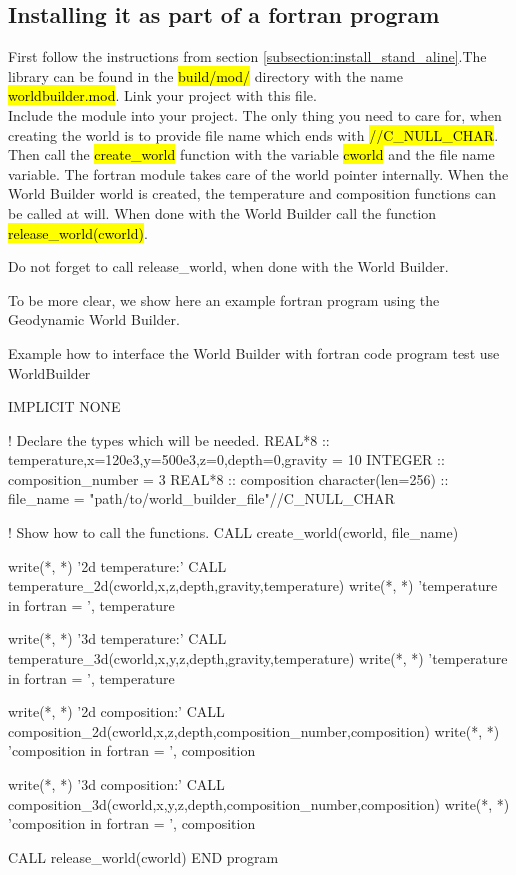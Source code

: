 \documentclass{book}
\newcommand{\GWB}{{Geodynamic World Builder}}
\newcommand{\WB}{{World Builder}}
\begin{document}
\subsection{Installing it as part of a fortran program}
First follow the instructions from section \ref{subsection:install_stand_aline}.The library can be found in the \hl{build/mod/} directory with the name \hl{worldbuilder.mod}. Link your project with this file. 
\\
Include the module into your project. The only thing you need to care for, when creating the world is to provide file name which ends with \hl{//C\_NULL\_CHAR}. Then call the \hl{create\_world} function with the variable \hl{cworld} and the file name variable. The fortran module takes care of the world pointer internally. When the \WB{} world is created, the temperature and composition functions can be called at will. When done with the \WB{} call the function \hl{release\_world(cworld)}. 
\begin{remark}
Do not forget to call release\_world, when done with the \WB{}.
\end{remark}
To be more clear, we show here an example fortran program using the \GWB{}. 

\begin{fortrancode}{Example how to interface the \WB{} with fortran code}
program test
use WorldBuilder

IMPLICIT NONE

  ! Declare the types which will be needed.
  REAL*8 :: temperature,x=120e3,y=500e3,z=0,depth=0,gravity = 10
  INTEGER :: composition_number = 3
  REAL*8 :: composition
  character(len=256) :: file_name = "path/to/world_builder_file"//C_NULL_CHAR

  ! Show how to call the functions.
  CALL create_world(cworld, file_name)

  write(*, *) '2d temperature:'
  CALL temperature_2d(cworld,x,z,depth,gravity,temperature)
  write(*, *) 'temperature in fortran = ', temperature

  write(*, *) '3d temperature:'
  CALL temperature_3d(cworld,x,y,z,depth,gravity,temperature)
  write(*, *) 'temperature in fortran = ', temperature

    write(*, *) '2d composition:'
  CALL composition_2d(cworld,x,z,depth,composition_number,composition)
  write(*, *) 'composition in fortran = ', composition

  write(*, *) '3d composition:'
  CALL composition_3d(cworld,x,y,z,depth,composition_number,composition)
  write(*, *) 'composition in fortran = ', composition

  CALL release_world(cworld)
END program
\end{fortrancode}
\end{document}
